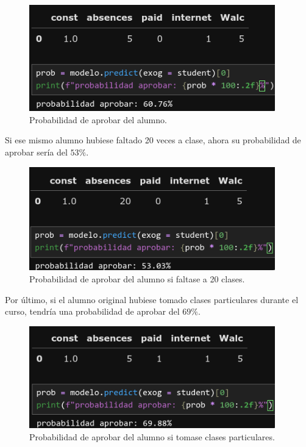 \begin{figure}[H]
    \begin{center}
        \includegraphics[width=0.95\textwidth]{figures/prob-aprobar-1.png}
    \end{center}
    \caption{Probabilidad de aprobar del alumno.}\label{fig:prob-aprobar-1}
\end{figure}

Si ese mismo alumno hubiese faltado 20 veces a clase, ahora su probabilidad de aprobar sería del $53\%$.
\begin{figure}[H]
    \begin{center}
        \includegraphics[width=0.95\textwidth]{figures/prob-aprobar-2.png}
    \end{center}
    \caption{Probabilidad de aprobar del alumno si faltase a 20 clases.}\label{fig:prob-aprobar-2}
\end{figure}

Por último, si el alumno original hubiese tomado clases particulares durante el curso, tendría una probabilidad de aprobar del $69\%$.
\begin{figure}[H]
    \begin{center}
        \includegraphics[width=0.95\textwidth]{figures/prob-aprobar-3.png}
    \end{center}
    \caption{Probabilidad de aprobar del alumno si tomase clases particulares.}\label{fig:prob-aprobar-3}
\end{figure}
